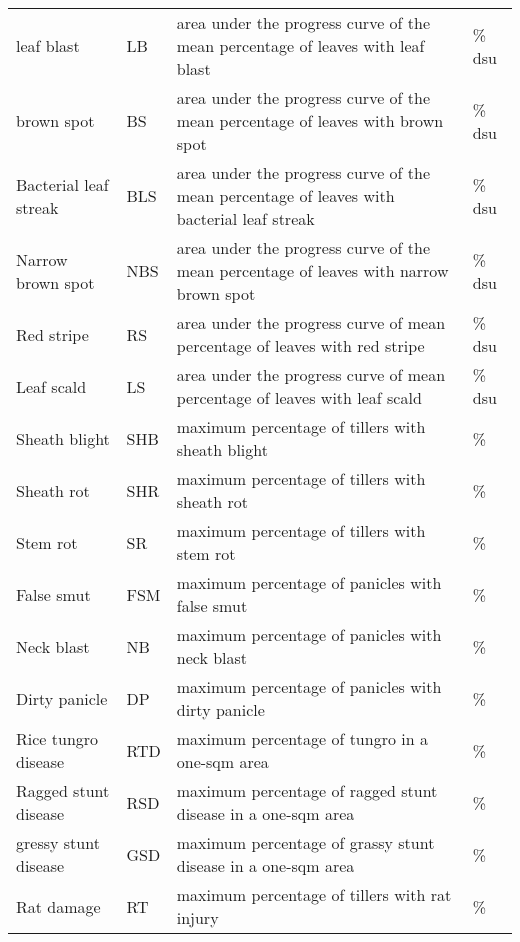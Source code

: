 \begin{table}[]
\begin{tabular}{llll}
leaf blast            & LB      & area under the progress curve of the mean percentage of leaves with leaf blast            & \% dsu \\
brown spot            & BS      & area under the progress curve of the mean percentage of leaves with brown spot            & \% dsu \\
Bacterial leaf streak & BLS     & area under the progress curve of the mean percentage of leaves with bacterial leaf streak & \% dsu \\
Narrow brown spot     & NBS     & area under the progress curve of the mean percentage of leaves with narrow brown spot     & \% dsu \\
Red stripe            & RS      & area under the progress curve of mean percentage of leaves with red stripe                & \% dsu \\
Leaf scald            & LS      & area under the progress curve of mean percentage of leaves with leaf scald                & \% dsu \\
Sheath blight         & SHB     & maximum percentage of tillers with sheath blight                                          & \%     \\
Sheath rot            & SHR     & maximum percentage of tillers with sheath rot                                             & \%     \\
Stem rot              & SR      & maximum percentage of tillers with stem rot                                               & \%     \\
False smut            & FSM     & maximum percentage of panicles with false smut                                            & \%     \\
Neck blast            & NB      & maximum percentage of panicles with neck blast                                            & \%     \\
Dirty panicle         & DP      & maximum percentage of panicles with dirty panicle                                         & \%     \\
Rice tungro disease   & RTD     & maximum percentage of tungro in a one-sqm area                                            & \%     \\
Ragged stunt disease  & RSD     & maximum percentage of ragged stunt disease in a one-sqm area                              & \%     \\
gressy stunt disease  & GSD     & maximum percentage of grassy stunt disease in a one-sqm area                              & \%     \\
Rat damage            & RT      & maximum percentage of tillers with rat injury                                             & \%    
\end{tabular}
\end{table}